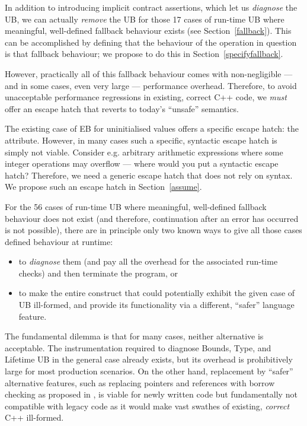 In addition to introducing implicit contract assertions, which let us \emph{diagnose} the UB, we can actually \emph{remove} the UB for those 17 cases of run-time UB where meaningful, well-defined fallback behaviour exists (see Section~\ref{fallback}). This can be accomplished by defining that the behaviour of the operation in question is that fallback behaviour; we propose to do this in Section~\ref{specifyfallback}.

However, practically all of this fallback behaviour comes with non-negligible --- and in some cases, even very large --- performance overhead. Therefore, to avoid unacceptable performance regressions in existing, correct C++ code, we \emph{must} offer an escape hatch that reverts to today's ``unsafe'' semantics.

The existing case of EB for uninitialised values offers a specific escape hatch: the \tcode{[[indeterminate]]} attribute. However, in many cases such a specific, syntactic escape hatch is simply not viable. Consider e.g. arbitrary arithmetic expressions where some integer operations may overflow --- where would you put a syntactic escape hatch? Therefore, we need a generic escape hatch that does not rely on syntax. We propose such an escape hatch in Section~\ref{assume}.

For the 56 cases of run-time UB where meaningful, well-defined fallback behaviour does not exist (and therefore, continuation after an error has occurred is not possible), there are in principle only two known ways to give all those cases defined behaviour at runtime:
\begin{itemize}
\item to \emph{diagnose} them (and pay all the overhead for the associated run-time checks) and then terminate the program, or
\item to make the entire construct that could potentially exhibit the given case of UB ill-formed, and provide its functionality via a different, ``safer'' language feature.
\end{itemize}

The fundamental dilemma is that for many cases, neither alternative is acceptable. The instrumentation required to diagnose Bounds, Type, and Lifetime UB in the general case already exists, but its overhead is prohibitively large for most production scenarios. On the other hand, replacement by ``safer'' alternative features, such as replacing pointers and references with borrow checking as proposed in \cite{P3390R0}, is viable for newly written code but fundamentally not compatible with legacy code as it would make vast swathes of existing, \emph{correct} C++ ill-formed.

